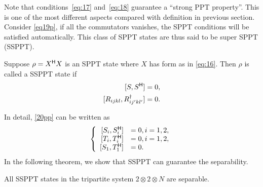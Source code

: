 Note that conditions~\eqref{eq:17} and~\eqref{eq:18} guarantee a ``strong PPT property''. This is one of the most different aspects compared with definition in previous section. 
Consider \cref{eq19p}, if all the  commutators vanishes, the SPPT conditions will be satisfied automatically. This class
of SPPT states are thus said to be super SPPT (SSPPT).
\begin{defi}
  Suppose  $\rho=X^{\mathsf{H}} X$ is an SPPT state where $X$ has form as in \cref{eq:16}. Then $\rho$ is called a SSPPT state if
  \begin{equation}
  \label{20pp}
  \begin{split}  
  	[S,S^{\mathsf{H}}] &= 0,\\
  	[R_{ijkl},R^\dagger_{ij'kl'}] &=0.
  	 \end{split}
  \end{equation}  
\end{defi}
In detail, \cref{20pp} can be written  as 
\begin{equation}
\label{eq:20p}
\left\lbrace
\begin{array}{rl}%
[S_i,\adj S_i] & = 0,i=1,2,\\
{[}T_i,\adj T_i] &= 0,i=1,2,\\
{[}S_1,\adj T_1] & = 0.\\
\end{array}
\right.
\end{equation}
 In the following theorem, we show that SSPPT can guarantee the separability.
\begin{thm}
  All SSPPT states in the tripartite system $2\otimes 2\otimes N$ are separable.
\end{thm}
